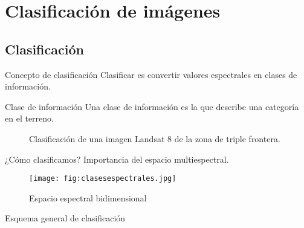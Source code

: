 \section{Clasificación de imágenes}

\subsection{Clasificación}
\begin{frame}{}
\begin{block}{Concepto de clasificación}
  Clasificar es convertir valores espectrales en clases de información.
\end{block}
\end{frame}

\begin{frame}{}
\begin{block}{Clase de información}
  Una clase de información es la que describe una categoría en el terreno.
\end{block}
\end{frame}

\begin{frame}{}
  \begin{figure}
    \centering
    \hspace{1cm}
    \caption{Clasificación de una imagen Landsat 8 de la zona de triple frontera.}
    \label{}
  \end{figure}
\end{frame}

\begin{frame}{}
\begin{block}{¿Cómo clasificamos?}
 Importancia del espacio multiespectral.
\end{block}
\end{frame}

\begin{frame}{}
  \begin{figure}
    \centering
    \texttt{[image: fig:clasesespectrales.jpg]}
    \caption{Espacio espectral bidimensional}
    \label{}
  \end{figure}
\end{frame}
\begin{frame}{}
  \begin{block}{Esquema general de clasificación}
    \begin{center}
    \end{center}
  \end{block}
\end{frame}

